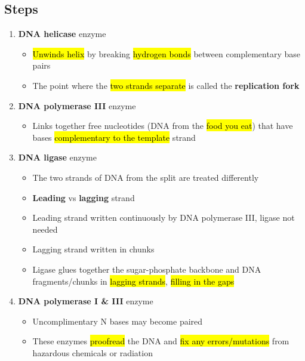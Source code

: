 \documentclass[a4paper,12pt]{article}
\begin{document}
\subsection{Steps}
\begin{enumerate}
    \item{
            \textbf{DNA helicase} enzyme
            \begin{itemize}
                \item{\hl{Unwinds helix} by breaking \hl{hydrogen bonds} between complementary base pairs}
                \item{The point where the \hl{two strands separate} is called the \textbf{replication fork}}
            \end{itemize}
        }
    \item{
            \textbf{DNA polymerase III} enzyme
            \begin{itemize}
                \item{Links together free nucleotides (DNA from the \hl{food you eat}) that have bases \hl{complementary to the template} strand}
            \end{itemize}
        }
    \item{
            \textbf{DNA ligase} enzyme
            \begin{itemize}
                \item{The two strands of DNA from the split are treated differently}
                \item{\textbf{Leading} vs \textbf{lagging} strand}
                \item{Leading strand written continuously by DNA polymerase III, ligase not needed}
                \item{Lagging strand written in chunks}
                \item{Ligase glues together the sugar-phosphate backbone and DNA fragments/chunks in \hl{lagging strands}, \hl{filling in the gaps}}
            \end{itemize}
        }
    \item{
            \textbf{DNA polymerase I \& III} enzyme
            \begin{itemize}
                \item{Uncomplimentary N bases may become paired}
                \item{These enzymes \hl{proofread} the DNA and \hl{fix any errors/mutations} from hazardous chemicals or radiation}
            \end{itemize}
        }
\end{enumerate}
\end{document}
